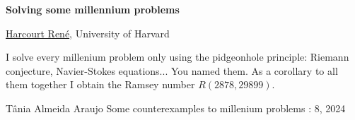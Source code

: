 \documentclass[a4paper, 11pt]{article}
\newcommand{\abstracttitle}[1]{{
    \centering
    \LARGE \textbf{#1}\\
    \vspace*{0.7cm}
}}
\newcommand{\firstauthor}[2]{{
    \centering
    \underline{#1}, \textsf{#2}\\
    \vspace*{0.25cm}
}}
\newcommand{\abstracttext}[1]{
    \vspace{0.6cm}
    #1
}
\begin{document}
\abstracttitle{Solving some millennium problems}

\firstauthor{Harcourt René}{University of Harvard}

\abstracttext{
    I solve every millenium problem only using the pidgeonhole principle: Riemann conjecture, Navier-Stokes equations... You named them. As a corollary to all them together I obtain the Ramsey number $R(2878,29899)$.
}

\begin{thebibliography}{9}
Tânia Almeida Araujo
\newblock Some counterexamples to millenium problems
: 8, 2024
\end{thebibliography}
\end{document}

